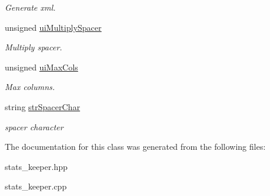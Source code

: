 \begin{DoxyCompactItemize}
\begin{DoxyCompactList}\small\item\em Generate xml. \item\end{DoxyCompactList}\item 
\hypertarget{classstats__keeper_a77ee69cc8b6a80296c69b8af4de678f1}{
unsigned \hyperlink{classstats__keeper_a77ee69cc8b6a80296c69b8af4de678f1}{uiMultiplySpacer}}
\label{classstats__keeper_a77ee69cc8b6a80296c69b8af4de678f1}

\begin{DoxyCompactList}\small\item\em Multiply spacer. \item\end{DoxyCompactList}\item 
\hypertarget{classstats__keeper_ac5ad6cbbee0763290d1569ee7ff70b29}{
unsigned \hyperlink{classstats__keeper_ac5ad6cbbee0763290d1569ee7ff70b29}{uiMaxCols}}
\label{classstats__keeper_ac5ad6cbbee0763290d1569ee7ff70b29}

\begin{DoxyCompactList}\small\item\em Max columns. \item\end{DoxyCompactList}\item 
\hypertarget{classstats__keeper_acd8f177a6ee5df7bb623685fdf8b7c3c}{
string \hyperlink{classstats__keeper_acd8f177a6ee5df7bb623685fdf8b7c3c}{strSpacerChar}}
\label{classstats__keeper_acd8f177a6ee5df7bb623685fdf8b7c3c}

\begin{DoxyCompactList}\small\item\em spacer character \item\end{DoxyCompactList}\end{DoxyCompactItemize}


The documentation for this class was generated from the following files:\begin{DoxyCompactItemize}
\item 
stats\_\-keeper.hpp\item 
stats\_\-keeper.cpp\end{DoxyCompactItemize}
